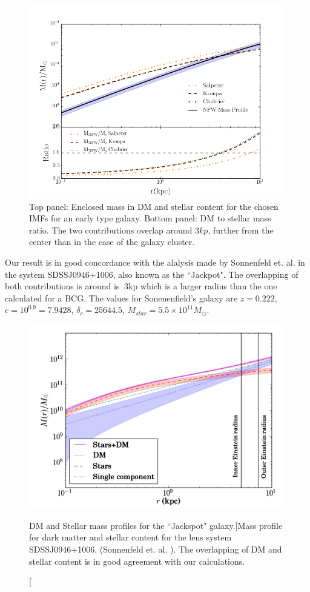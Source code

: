 \begin{figure}[H]
\centering
\includegraphics[width=12cm]{images/DM_fraction_all_IMFs_galaxy.png}
\caption[DM and Stellar mass profiles for a massive early type galaxy.]{Top panel: Enclosed mass in DM and stellar content for the chosen IMFs for an early type galaxy. Bottom panel: DM to stellar mass ratio. The two contributions overlap around $3 kp$, further from the center than in the case of the galaxy cluster.}
\end{figure}

Our result is in good concordance with the alalysis made by Sonnenfeld et. al. \citeyear{Reference15} in the system SDSSJ0946+1006, also known as the ``Jackpot". The overlapping of both contributions is around is $~3\text{kp}$ which is a larger radius than the one calculated for a BCG. The values for Sonenenfield's galaxy are $z=0.222$, $c=10^{0.9}=7.9428$, $\delta_c=25644.5$, $M_{star}=5.5\times 10^{11} M_{\odot}$.

\begin{figure}[H]
\centering
\includegraphics[width=12cm]{images/sonnenfeld_galaxy.png}
\caption[DM and Stellar mass profiles for the ``Jackspot" galaxy.]{Mass profile for dark matter and stellar content for the lens system SDSSJ0946+1006. (Sonnenfeld et. al. \citeyear{Reference15}). The overlapping of DM and stellar content is in good agreement with our calculations.}
\end{figure}

